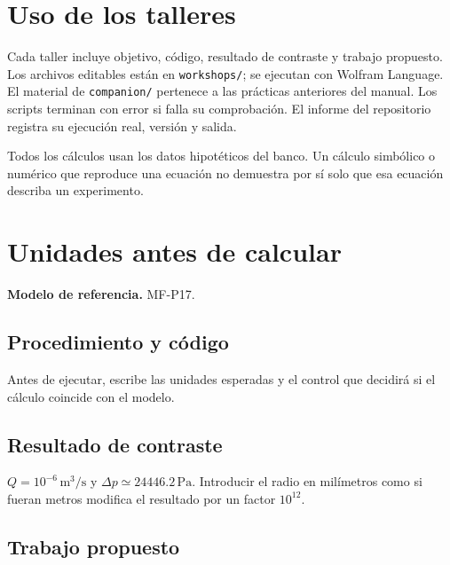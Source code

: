 \chapter*{Uso de los talleres}
Cada taller incluye objetivo, código, resultado de contraste y trabajo propuesto. Los archivos editables están en \texttt{workshops/}; se ejecutan con Wolfram Language. El material de \texttt{companion/} pertenece a las prácticas anteriores del manual. Los scripts terminan con error si falla su comprobación. El informe del repositorio registra su ejecución real, versión y salida.

Todos los cálculos usan los datos hipotéticos del banco. Un cálculo simbólico o numérico que reproduce una ecuación no demuestra por sí solo que esa ecuación describa un experimento.


\chapter{Unidades antes de calcular}


\textbf{Modelo de referencia.} MF-P17.\par

\section{Procedimiento y código}

Antes de ejecutar, escribe las unidades esperadas y el control que decidirá si el cálculo coincide con el modelo.



\section{Resultado de contraste}

$Q=10^{-6}\,\mathrm{m^3/s}$ y $\Delta p\simeq24446.2\,\mathrm{Pa}$. Introducir el radio en milímetros como si fueran metros modifica el resultado por un factor $10^{12}$.

\section{Trabajo propuesto}


